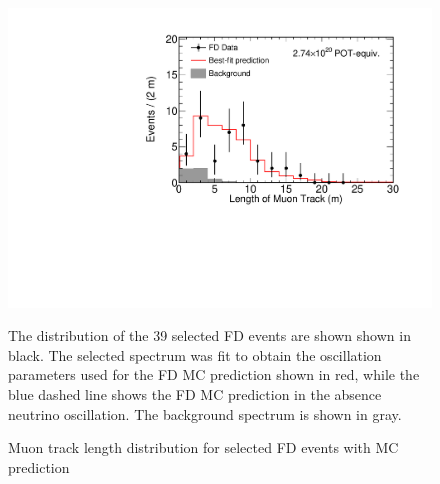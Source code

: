 \begin{figure}
\begin{center}
\includegraphics[width=\textwidth]{figures/results/fd_data_mc_numi_plots/trkLength_unblind.pdf}
\end{center}
\caption{Muon track length distribution for selected FD events
with MC prediction }{
The distribution of the 39 selected FD events are shown shown in black.
The selected spectrum was fit to obtain the oscillation parameters used
for the FD MC prediction shown in red, while
the blue dashed line shows the FD MC prediction in the absence neutrino
oscillation.
The background spectrum is shown in gray.
}
\label{trkLength_unblind}

\end{figure}



